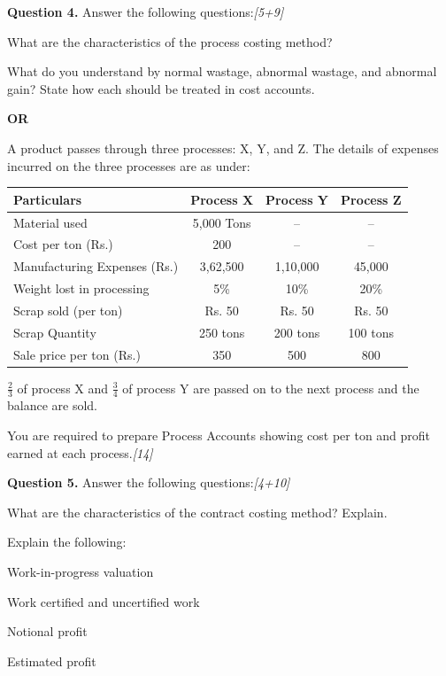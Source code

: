 \documentclass[11pt,a4paper]{article}
\newcommand{\pts}[1]{\hfill   \textit{[#1]}}
\begin{document}
\noindent   \textbf{Question 4.}
Answer the following questions:\pts{5+9}

\begin{parts}
  \item What are the characteristics of the process costing method?
  \item What do you understand by normal wastage, abnormal wastage, and abnormal gain? State how each should be treated in cost accounts.
\end{parts}

\centerline{   \textbf{OR}}

A product passes through three processes: X, Y, and Z. The details of expenses incurred on the three processes are as under:


\begin{center}
\small

\begin{tabular}{|l|c|c|c|}
\hline
   \textbf{Particulars} &   \textbf{Process X} &   \textbf{Process Y} &   \textbf{Process Z} \\
\hline
Material used & 5,000 Tons & -- & -- \\
Cost per ton (Rs.) & 200 & -- & -- \\
Manufacturing Expenses (Rs.) & 3,62,500 & 1,10,000 & 45,000 \\
Weight lost in processing & 5\% & 10\% & 20\% \\
Scrap sold (per ton) & Rs. 50 & Rs. 50 & Rs. 50 \\
Scrap Quantity & 250 tons & 200 tons & 100 tons \\
Sale price per ton (Rs.) & 350 & 500 & 800 \\
\hline
\end{tabular}
\end{center}

$\frac{2}{3}$ of process X and $\frac{3}{4}$ of process Y are passed on to the next process and the balance are sold.

You are required to prepare Process Accounts showing cost per ton and profit earned at each process.\pts{14}

\pagebreak




\noindent   \textbf{Question 5.}
Answer the following questions:\pts{4+10}

\begin{parts}
  \item What are the characteristics of the contract costing method? Explain.
  \item Explain the following:
    
\begin{parts}
      \item Work-in-progress valuation
      \item Work certified and uncertified work
      \item Notional profit
      \item Estimated profit
    \end{parts}
\end{parts}
\end{document}
